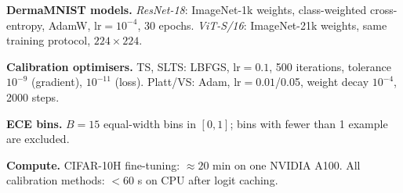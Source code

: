 \documentclass[10pt,journal,compsoc]{IEEEtran}
\begin{document}
\noindent\textbf{DermaMNIST models.}
\textit{ResNet-18}: ImageNet-1k weights, class-weighted cross-entropy, AdamW, lr$=10^{-4}$, 30 epochs.
\textit{ViT-S/16}: ImageNet-21k weights, same training protocol, $224\times224$.

\noindent\textbf{Calibration optimisers.}
TS, SLTS: LBFGS, lr$=0.1$, 500 iterations, tolerance $10^{-9}$ (gradient), $10^{-11}$ (loss).  Platt/VS: Adam, lr$=0.01$/0.05, weight decay $10^{-4}$, 2000 steps.

\noindent\textbf{ECE bins.}
$B=15$ equal-width bins in $[0,1]$; bins with fewer than 1 example are excluded.

\noindent\textbf{Compute.}
CIFAR-10H fine-tuning: ${\approx}20$ min on one NVIDIA A100.  All calibration methods: $<60$ s on CPU after logit caching.
\end{document}

